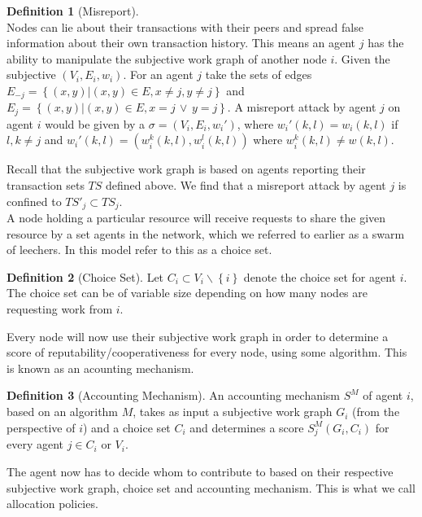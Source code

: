 \documentclass[11pt,a4paper]{article}
\theoremstyle{definition}
\newtheorem{definition}{Definition}[section]
\theoremstyle{theorem}
\theoremstyle{proposition}
\theoremstyle{corollary}
\theoremstyle{lemma}
\theoremstyle{example}
\theoremstyle{remark}
\begin{document}
\begin{definition}[Misreport]\ \\
Nodes can lie about their transactions with their peers and spread false information about their own transaction history. This means an agent $j$ has the ability to manipulate the subjective work graph of another node $i$. Given the subjective  $(V_i,E_i,w_i)$.  For an agent $j$ take the sets of edges $E_{-j}=\left\lbrace{}(x,y)|(x,y)\in{}E,x\neq{}j,y\neq{}j\right\rbrace$ and $E_{j}=\left\lbrace{}(x,y)|(x,y)\in{}E,x=j\,\vee\,y=j\right\rbrace$. A misreport attack by agent $j$ on agent $i$ would be given by a $\sigma=(V_i,E_i,w_i')$, where $w_i'(k,l) = w_i(k,l)$ if $l,k\neq{}j$ and $w_i'(k,l) = (w^k_i(k,l), w^l_i(k,l))$ where $w^k_i(k,l)\neq{}w(k,l).$ 
\end{definition}

\noindent{}Recall that the subjective work graph is based on agents reporting their transaction sets $TS$ defined above. We find that a misreport attack by agent $j$ is confined to $TS'_j\subset{}TS_j$. \vspace{1em}\\

\noindent{}A node holding a particular resource will receive requests to share the given resource by a set agents in the network, which we referred to earlier as a swarm of leechers. In this model \cite{} refer to this as a choice set.

\begin{definition}[Choice Set]
Let $C_i\subset{}V_i\backslash{}\left\lbrace{}i\right\rbrace$ denote the choice set for agent $i$. The choice set can be of variable size depending on how many nodes are requesting work from $i$. 
\end{definition}

\noindent{}Every node will now use their subjective work graph in order to determine a score of reputability/cooperativeness for every node, using some algorithm. This is known as an acounting mechanism.

\begin{definition}[Accounting Mechanism]
An accounting mechanism $S^M$ of agent $i$, based on an algorithm $M$, takes as input a subjective work graph $G_i$ (from the perspective of $i$) and a choice set $C_i$ and determines a score $S^M_j(G_i,C_i)$ for every agent $j\in{}C_i$ or $V_i$. 
\end{definition}

\noindent{}The agent now has to decide whom to contribute to based on their respective subjective work graph, choice set and accounting mechanism. This is what we call allocation policies. \vspace{1em}\\
\end{document}
